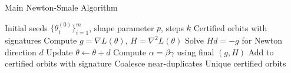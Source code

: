 \documentclass[11pt]{amsart}
\theoremstyle{plain}
\theoremstyle{definition}
\theoremstyle{remark}
\begin{document}
\begin{algorithm}
\caption{Main Newton-Smale Algorithm}
\begin{algorithmic}
\REQUIRE Initial seeds $\{\theta^{(0)}_i\}_{i=1}^m$, shape parameter $p$, steps $k$
\ENSURE Certified orbits with signatures
        \STATE Compute $g = \nabla L(\theta)$, $H = \nabla^2 L(\theta)$
        \STATE Solve $Hd = -g$ for Newton direction $d$
        \STATE Update $\theta \leftarrow \theta + d$
    \ENDFOR
    \STATE Compute $\alpha = \beta \gamma$ using final $(g, H)$
        \STATE Add to certified orbits with signature
    \ENDIF
\ENDFOR
\STATE Coalesce near-duplicates
\RETURN Unique certified orbits
\end{algorithmic}
\end{algorithm}


\end{document}
